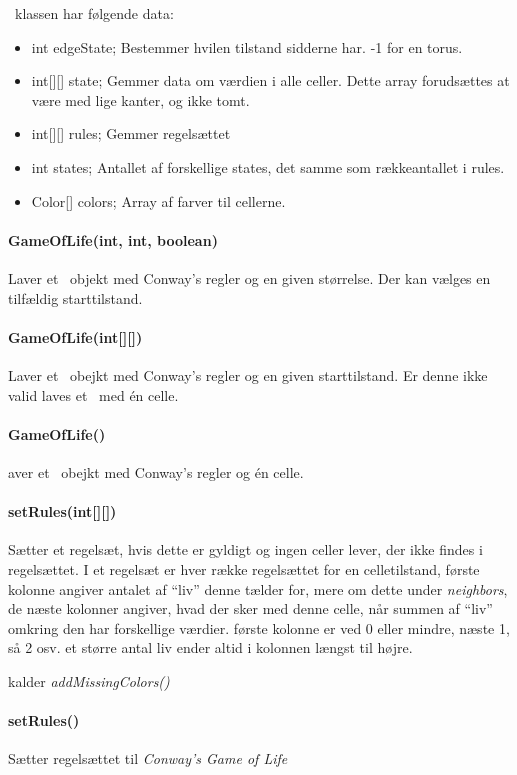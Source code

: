 \gol~klassen har følgende data:
\begin{itemize}
  \item int edgeState; Bestemmer hvilen tilstand sidderne har. -1 for en torus.
  \item int[][] state; Gemmer data om værdien i alle celler. Dette array forudsættes at være med lige kanter, og ikke tomt.
  \item int[][] rules; Gemmer regelsættet
  \item int states; Antallet af forskellige states, det samme som rækkeantallet i rules.
  \item Color[] colors; Array af farver til cellerne.
\end{itemize}




\paragraph{ GameOfLife(int, int, boolean)} Laver et \gol~objekt med Conway's regler og en given størrelse. Der kan vælges en tilfældig starttilstand.

\paragraph{ GameOfLife(int[][]) } Laver et \gol~obejkt med Conway's regler og en given starttilstand. Er denne ikke valid laves et \gol~med én celle.

\paragraph{GameOfLife()} aver et \gol~obejkt med Conway's regler og én celle.

\paragraph{setRules(int[][])} Sætter et regelsæt, hvis dette er gyldigt og ingen celler lever, der ikke findes i regelsættet.
I et regelsæt er hver række regelsættet for en celletilstand, første kolonne angiver antalet af ``liv'' denne tælder for,
mere om dette under \emph{neighbors}, de næste kolonner angiver, hvad der sker med denne celle, når summen af ``liv''
omkring den har forskellige værdier. første kolonne er ved 0 eller mindre, næste 1, så 2 osv. et større antal liv ender altid i kolonnen længst til højre.

kalder \emph{addMissingColors()}

\paragraph{setRules()} Sætter regelsættet til \emph{Conway's Game of Life}


